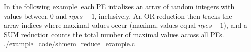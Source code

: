 \begin{apidefinition}
\begin{apiexamples}

\apicexample
    {In the following \Cstd[11] example, each \ac{PE} intializes an array of
    random integers with values between $0$ and $npes-1$, inclusively.  An OR
    reduction then tracks the array indices where maximal values occur (maximal
    values equal $npes - 1$), and a SUM reduction counts the total number of
    maximal values across all PEs.
    }
    {./example_code/shmem_reduce_example.c}
    {}

\end{apiexamples}

\end{apidefinition}
